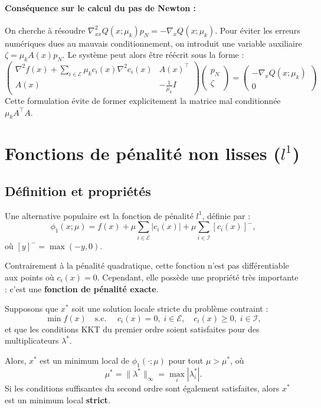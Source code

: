\paragraph{Conséquence sur le calcul du pas de Newton :}
    On cherche à résoudre $\nabla_{xx}^2 Q(x; \mu_k) p_N = -\nabla_x Q(x; \mu_k)$.
    Pour éviter les erreurs numériques dues au mauvais conditionnement, on introduit une variable auxiliaire $\zeta = \mu_k A(x) p_N$.
    Le système peut alors être réécrit sous la forme :
    \[
    \begin{pmatrix}
        \nabla^2 f(x) + \sum_{i \in \mathcal{E}} \mu_k c_i(x) \nabla^2 c_i(x) & A(x)^\top \\
        A(x) & -\frac{1}{\mu_k} I
    \end{pmatrix}
    \begin{pmatrix}
        p_N \\
        \zeta
    \end{pmatrix}
    =
    \begin{pmatrix}
        -\nabla_x Q(x; \mu_k) \\
        0
    \end{pmatrix}
    \]
    Cette formulation évite de former explicitement la matrice mal conditionnée $\mu_k A^\top A$.

\section{Fonctions de pénalité non lisses ($l^1$)}

\subsection{Définition et propriétés}

Une alternative populaire est la fonction de pénalité $l^1$, définie par :
\[
    \phi_1(x; \mu) = f(x) + \mu \sum_{i \in \mathcal{E}} |c_i(x)| + \mu \sum_{i \in \mathcal{I}} [c_i(x)]^-,
\]
où $[y]^- = \max(-y, 0)$.

Contrairement à la pénalité quadratique, cette fonction n'est pas différentiable aux points où $c_i(x) = 0$. Cependant, elle possède une propriété très importante : c'est une \textbf{fonction de pénalité exacte}.

\begin{theoreme}
    Supposons que $x^*$ soit une solution locale stricte du problème contraint :
    \[
        \min f(x) \quad \text{s.c. } \quad c_i(x) = 0, \; i \in \mathcal{E}, \quad c_i(x) \ge 0, \; i \in \mathcal{I},
    \]
    et que les conditions KKT du premier ordre soient satisfaites pour des multiplicateurs $\lambda^*$.
    
    Alors, $x^*$ est un minimum local de $\phi_1(\cdot; \mu)$ pour tout $\mu > \mu^*$, où
    \[
        \mu^* = \|\lambda^*\|_\infty = \max_i |\lambda_i^*|.
    \]
    Si les conditions suffisantes du second ordre sont également satisfaites, alors $x^*$ est un minimum local \textbf{strict}.
\end{theoreme}

